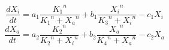 \documentclass[preview]{standalone}
\begin{document}
$$\frac{dX_i}{dt} = a_1 \frac{{K_1}^n}{{K_1}^n+{X_a}^n} + b_1 \frac{{X_i}^n}{{K_3}^n+{X_i}^n} - c_1 X_i $$
$$\frac{dX_a}{dt} = a_2 \frac{{K_2}^n}{{K_2}^n+{X_i}^n} + b_2 \frac{{X_a}^n}{{K_4}^n+{X_a}^n} - c_2 X_a $$
\end{document}
